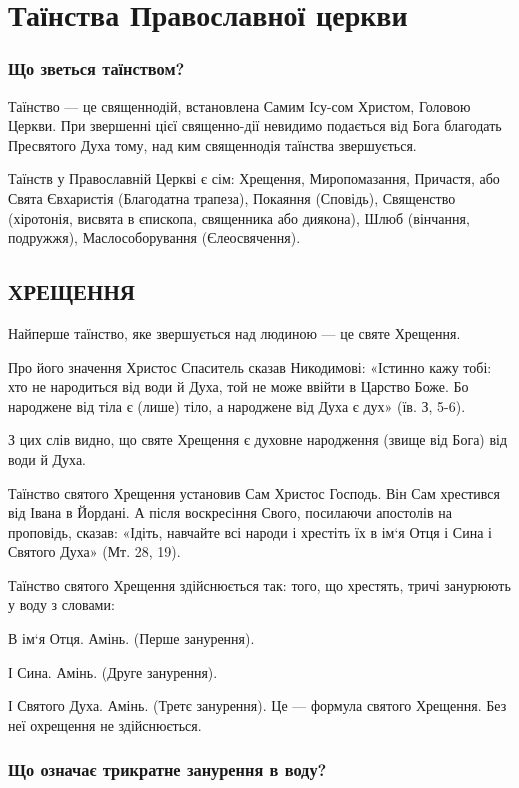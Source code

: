 \documentclass[main.tex]{subfiles}
\begin{document}
\chapter{Таїнства Православної церкви}

\subsection{Що зветься таїнством?}

Таїнство — це священнодій, встановлена Самим Ісу-сом Христом, Головою Церкви. При звершенні цієї священно-дії невидимо подається від Бога благодать Пресвятого Духа тому, над ким священнодія таїнства звершується.

Таїнств у Православній Церкві є сім: Хрещення, Миропомазання, Причастя, або Свята Євхаристія (Благодатна трапеза), Покаяння (Сповідь), Священство (хіротонія, висвята в єпископа, священника або диякона), Шлюб (вінчання, подружжя), Маслособорування (Єлеосвячення).

\section{ХРЕЩЕННЯ}

Найперше таїнство, яке звершується над людиною — це святе Хрещення.

Про його значення Христос Спаситель сказав Никодимові: «Істинно кажу тобі: хто не народиться від води й Духа, той не може ввійти в Царство Боже. Бо народжене від тіла є (лише) тіло, а народжене від Духа є дух» (їв. З, 5-6).

З цих слів видно, що святе Хрещення є духовне народження (звище від Бога) від води й Духа.

Таїнство святого Хрещення установив Сам Христос Господь. Він Сам хрестився від Івана в Йордані. А після воскресіння Свого, посилаючи апостолів на проповідь, сказав: «Ідіть, навчайте всі народи і хрестіть їх в ім`я Отця і Сина і Святого Духа» (Мт. 28, 19).

Таїнство святого Хрещення здійснюється так: того, що хрестять, тричі занурюють у воду з словами:

В ім`я Отця. Амінь. (Перше занурення).

І Сина. Амінь. (Друге занурення).

І Святого Духа. Амінь. (Третє занурення). Це — формула святого Хрещення. Без неї охрещення не здійснюється.

\subsection{Що означає трикратне занурення в воду?}
\end{document}
